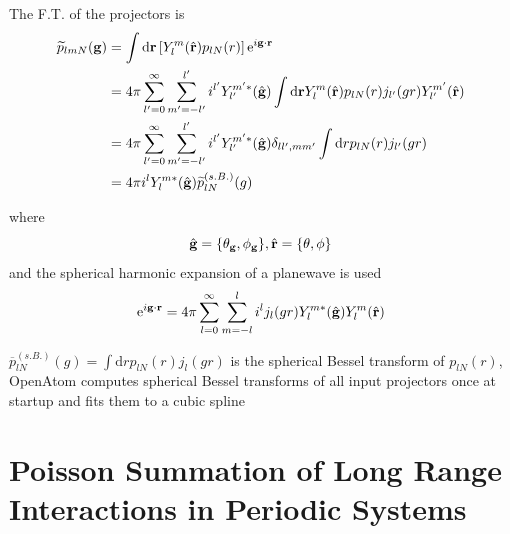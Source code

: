 \documentclass[paper=a4, fontsize=11pt]{article} %
\numberwithin{equation}{section} %
\numberwithin{figure}{section} %
\numberwithin{table}{section} %
\newcommand{\wt}{\widetilde}
\newcommand{\bg}{{\bf{g}}}
\newcommand{\br}{{\bf{r}}}
\newcommand{\re}{{\mathrm{e}}}
\newcommand{\rd}{{\mathrm{d}}}
\newcommand{\ibgr}{i\bg\cdot\br}
\begin{document}
The F.T. of the projectors is
\begin{equation}
\begin{split}
\wt p_{lmN}(\bg) 
&= \int \rd \br \left[ Y_l^m(\hat{ \br})p_{lN}(r)\right]\re^{\ibgr} \\
&= 4\pi \sum_{l'=0}^\infty \sum_{m'=-l'}^{l'} i^{l'} Y_{l'}^{m'*}(\hat{\bg}) \int \rd \br Y_l^m(\hat{ \br})p_{lN}(r)j_{l'}(gr) Y_{l'}^{m'}(\hat{\br}) \\
&= 4\pi \sum_{l'=0}^\infty \sum_{m'=-l'}^{l'} i^{l'} Y_{l'}^{m'*}(\hat{\bg}) \delta_{ll',mm'} \int \rd r p_{lN}(r)j_{l'}(gr)  \\
&= 4\pi i^{l} Y_l^{m*}(\hat{\bg}) \wt p _{lN}^{(s.B.)} (g)
\end{split}
\end{equation}

where
\begin{equation}
\hat{\bg} = \{\theta_\bg,\phi_\bg\}, 
\hat{\br} = \{\theta,\phi\}
\end{equation}
and the spherical harmonic expansion of a planewave is used
\begin{equation}
\re^{\ibgr}=4\pi \sum_{l=0}^\infty \sum_{m=-l}^l i^l j_l(gr) Y_l^{m*}(\hat{\bg})Y_l^m(\hat{\br})
\end{equation}

$\overline p _{lN}^{(s.B.)} (g) = \int \rd r p_{lN}(r)j_{l}(gr)$ is the spherical Bessel transform of $p_{lN}(r)$, OpenAtom computes spherical Bessel transforms of all input projectors once at startup and fits them to a cubic spline
\newpage
\section{Poisson Summation of Long Range Interactions in Periodic Systems}\label{App:FTphi}
\end{document}
